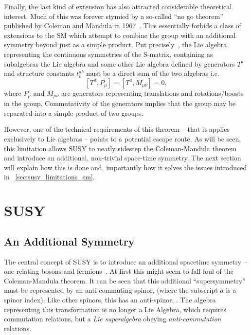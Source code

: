 Finally, the last kind of extension has also attracted considerable theoretical
interest. Much of this was forever stymied by a so-called ``no go theorem''
published by Coleman and Mandula in 1967~\cite{coleman_mandula}. This
essentially forbids a class of extensions to the \ac{SM} which attempt to
combine the \Poincare group with an additional symmetry beyond just as a simple
product. Put precisely~\cite{sparticles}, the Lie algebra representing the
continuous symmetries of the S-matrix, containing as subalgebras the \Poincare
Lie algebra and some other Lie algebra defined by generators $T^a$ and structure
constants $t^{ab}_c$ must be a direct sum of the two algebras i.e.
\begin{equation*}
\left[T^a, P_{\mu}\right] = \left[T^a, M_{\mu\nu}\right] = 0,
\end{equation*}
where $P_{\mu}$ and $M_{\mu\nu}$ are generators representing translations and
rotations/boosts in the \Poincare group. Commutativity of the generators implies
that the group may be separated into a simple product of two groups.

However, one of the technical requirements of this theorem -- that it applies
exclusively to Lie algebras -- points to a potential escape route. As will be
seen, this limitation allows \acf{SUSY} to neatly sidestep the Coleman-Mandula
theorem and introduce an additional, non-trivial space-time symmetry. The next
section will explain how this is done and, importantly how it solves the issues
introduced in \sec~\ref{sec:susy_limitations_sm}.

\section{\acl{SUSY}}
\subsection{An Additional Symmetry}
The central concept of \ac{SUSY} is to introduce an additional spacetime
symmetry -- one relating bosons and fermions~\cite{sparticles}. At first this
might seem to fall foul of the Coleman-Mandula theorem. It can be seen that this
additional ``supersymmetry'' must be represented by an anti-commuting spinor, \Qa
(where the subscript $a$ is a spinor index). Like other spinors, this has an
anti-spinor, \AQa. The algebra representing this transformation is no longer a
Lie Algebra, which requires commutation relations, but a \emph{Lie superalgebra}
obeying \emph{anti-commutation} relations.

